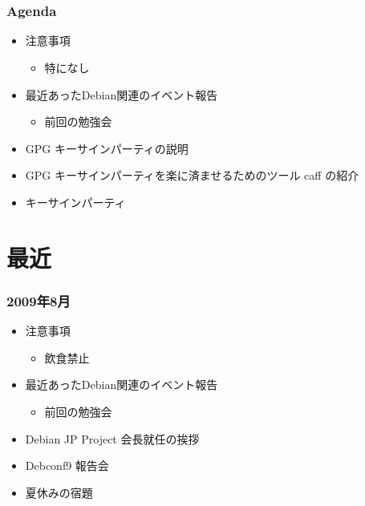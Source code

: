 \frame{\titlepage{}}


\section{}
\begin{frame}
 \frametitle{Agenda}
\begin{minipage}[t]{0.45\hsize}
  \begin{itemize}
  \item 注意事項
	\begin{itemize}
	 \item 特になし
	\end{itemize}
  \item 最近あったDebian関連のイベント報告
	\begin{itemize}
	 \item 前回の勉強会
	\end{itemize}
 \end{itemize}
\end{minipage} 
\begin{minipage}[t]{0.45\hsize}
 \begin{itemize}
  \item GPG キーサインパーティの説明
  \item GPG キーサインパーティを楽に済ませるためのツール caff の紹介
  \item キーサインパーティ
 \end{itemize}
\end{minipage}
\end{frame}

\section{最近}

\begin{frame}
 \frametitle{2009年8月}
\begin{minipage}[t]{0.45\hsize}
  \begin{itemize}
  \item 注意事項
	\begin{itemize}
	 \item 飲食禁止
	\end{itemize}
  \item 最近あったDebian関連のイベント報告
	\begin{itemize}
	 \item 前回の勉強会
	\end{itemize}
 \end{itemize}
\end{minipage} 
\begin{minipage}[t]{0.45\hsize}
 \begin{itemize}
  \item Debian JP Project 会長就任の挨拶
  \item Debconf9 報告会
  \item 夏休みの宿題
 \end{itemize}
\end{minipage}
\end{frame}

